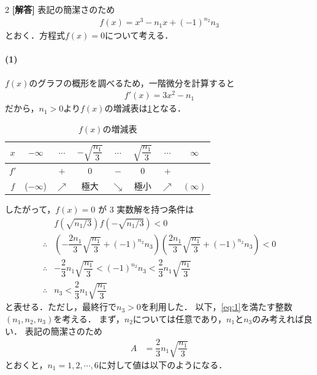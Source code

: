 \documentclass[../../main.tex]{subfiles}
\begin{document}
\setcounter{equation}{0}
\setcounter{figure}{0}
\setcounter{table}{0}
\begin{oframed}
  
\end{oframed}
\setlength{\columnseprule}{0.4pt}
\begin{multicols}{2}
  {\bf [解答]}
  表記の簡潔さのため
  \begin{align}
    f(x) = x^3 - n_1 x + (-1)^{n_2} n_3
  \end{align}
  とおく．方程式$f(x)=0$について考える．

  \paragraph{(1)}

  $f(x)$のグラフの概形を調べるため，一階微分を計算すると
  \begin{align}
    f'(x) = 3x^2 - n_1
  \end{align}
  だから，$n_1>0$より$f(x)$の増減表は\cref{2007-1:table:1}となる．

  \begin{table}[H]
    \centering
    \caption{$f(x)$の増減表}
    \label{2007-1:table:1}
    \begin{tabular}{|c||c|c|c|c|c|c|c|}
      \hline
      $x$  & $-\infty$   & $\cdots$   & $-\sqrt{\dfrac{n_1}{3}}$ & $\cdots$   & $\sqrt{\dfrac{n_1}{3}}$ & $\cdots$   & $\infty$   \\
      \hline
      $f'$ &             & $+$        & $0$                     & $-$        & $0$                    & $+$        &            \\
      \hline
      $f$  & ($-\infty$) & $\nearrow$ & 極大                      & $\searrow$ & 極小                     & $\nearrow$ & $(\infty)$ \\
      \hline
    \end{tabular}
  \end{table}

  したがって，$f(x)=0$ が $3$ 実数解を持つ条件は
  \begin{align}
    & f(\sqrt{n_1/3}) f(-\sqrt{n_1/3}) < 0                                                                          \nonumber                        \\
    \therefore
    & \left(-\dfrac{2n_1}{3}\sqrt{\dfrac{n_1}{3}} + (-1)^{n_2}n_3\right) \left(\dfrac{2n_1}{3}\sqrt{\dfrac{n_1}{3}} + (-1)^{n_2}n_3\right) < 0 \nonumber \\
    \therefore
    & -\dfrac{2}{3}n_1\sqrt{\dfrac{n_1}{3}} <(-1)^{n_2}n_3 < \dfrac{2}{3}n_1\sqrt{\dfrac{n_1}{3}}                          \nonumber                     \\
    \therefore
    & n_3 < \dfrac{2}{3}n_1\sqrt{\dfrac{n_1}{3}} \label{eq:1}
  \end{align}
  と表せる．ただし，最終行で$n_3>0$を利用した．
  以下，\cref{eq:1}を満たす整数$(n_1,n_2,n_3)$を考える．
  まず，$n_2$については任意であり，$n_1$と$n_3$のみ考えれば良い．
  表記の簡潔さのため
  \begin{align}
    A & = \dfrac{2}{3}n_1\sqrt{\dfrac{n_1}{3}}
  \end{align}
  とおくと，$n_1=1,2,\cdots,6$に対して値は以下のようになる．


\end{multicols}
\end{document}
